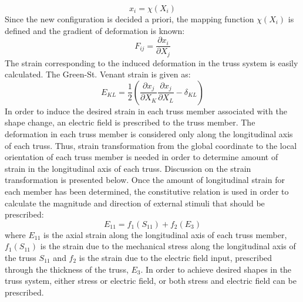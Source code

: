 \begin{equation}  
x_i=\chi (X_i)   
\label{lagrangian_descriptoin} 
\end{equation}
Since the new configuration is decided a priori, the mapping function $\chi (X_i)$ is defined and the gradient of deformation is known:
\begin{equation}
F_{ij}=\frac{\partial x_i}{\partial X_j}
\label{deformation_gradient_tensor}
\end{equation}
The strain corresponding to the induced deformation in the truss system is easily calculated.  
The Green-St. Venant strain is given as:
\begin{equation}
E_{KL}=\frac{1}{2}\left( \frac{\partial x_j}{\partial X_K}\frac{\partial x_j}{\partial X_L}-\delta_{KL}\right)
\label{lagrange_green_strain}
\end{equation}
In order to induce the desired strain in each truss member associated with the shape change, an electric field is prescribed to the truss member. The deformation in each truss member is considered only along the longitudinal axis of each truss. Thus, strain transformation from the global coordinate to the local orientation of each truss member is needed in order to determine amount of strain in the longitudinal axis of each truss. Discussion on the strain transformation is presented below. Once the amount of longitudinal strain for each member has been determined, the constitutive relation is used in order to calculate the magnitude and direction of external stimuli that should be prescribed: 
\begin{equation}
E_{11}=f_1(S_{11})+f_2(E_3)
\label{one_constitutive_equation}
\end{equation}
where $E_{11}$ is the axial strain along the longitudinal axis of each truss member, $f_1(S_{11})$ is the strain due to the mechanical stress along the longitudinal axis of the truss $S_{11}$ and $f_2$ is the strain due to the electric field input, prescribed through the thickness of the truss, $E_3$.
In order to achieve desired shapes in the truss system, either stress or electric field, or both stress and electric field can be prescribed.

